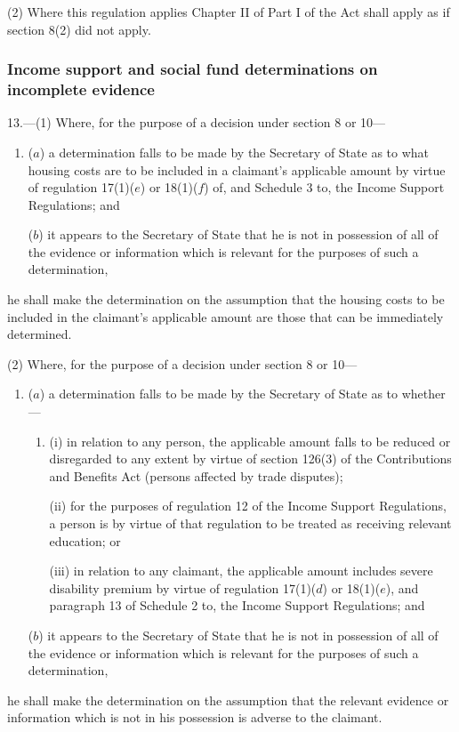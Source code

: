 \documentclass[12pt,a4paper]{article}
\begin{document}
(2) Where this regulation applies Chapter II of Part I of the Act shall apply as if section 8(2) did not apply.


\subsubsection[13. Income support and social fund determinations on incomplete evidence]{\sloppy Income support and social fund determinations on incomplete evidence}

13.—(1) Where, for the purpose of a decision under section 8 or 10—
\begin{enumerate}\item[]
($a$) a determination falls to be made by the Secretary of State as to what housing costs are to be included in a claimant’s applicable amount by virtue of regulation 17(1)($e$) or 18(1)($f$) of, and Schedule 3 to, the Income Support Regulations; and

($b$) it appears to the Secretary of State that he is not in possession of all of the evidence or information which is relevant for the purposes of such a determination,
\end{enumerate}
he shall make the determination on the assumption that the housing costs to be included in the claimant’s applicable amount are those that can be immediately determined.

(2) Where, for the purpose of a decision under section 8 or 10—
\begin{enumerate}\item[]
($a$) a determination falls to be made by the Secretary of State as to whether—
\begin{enumerate}\item[]
(i) in relation to any person, the applicable amount falls to be reduced or disregarded to any extent by virtue of section 126(3) of the Contributions and Benefits Act (persons affected by trade disputes);

(ii) for the purposes of regulation 12 of the Income Support Regulations, a person is by virtue of that regulation to be treated as receiving relevant education; or

(iii) in relation to any claimant, the applicable amount includes severe disability premium by virtue of regulation 17(1)($d$) or 18(1)($e$), and paragraph 13 of Schedule 2 to, the Income Support Regulations; and
\end{enumerate}

($b$) it appears to the Secretary of State that he is not in possession of all of the evidence or information which is relevant for the purposes of such a determination,
\end{enumerate}
he shall make the determination on the assumption that the relevant evidence or information which is not in his possession is adverse to the claimant.
\end{document}
